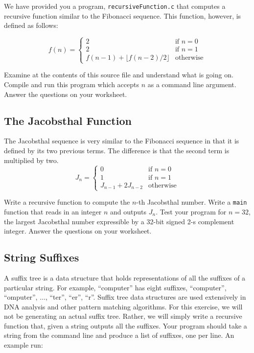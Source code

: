 \documentclass[12pt]{scrartcl}
\begin{document}
We have provided you a program, \texttt{recursiveFunction.c} 
that computes a recursive function similar to the Fibonacci sequence.  
This function, however, is defined as follows: 

$$f(n) = \left\{
\begin{array}{ll}
2 & \textrm{if } n = 0 \\
2 & \textrm{if } n = 1 \\
f(n-1) + \lfloor f(n-2) / 2 \rfloor & \textrm{otherwise}
\end{array}
\right.$$

Examine at the contents of this source file and understand what is 
going on.  Compile and run this program which accepts $n$ as a 
command line argument.  Answer the questions on your worksheet.

\subsection{The Jacobsthal Function}

The Jacobsthal sequence is very similar to the Fibonacci sequence 
in that it is defined by its two previous terms.  The difference is that 
the second term is multiplied by two.  
$$J_n = \left\{
\begin{array}{ll}
0 & \textrm{if } n = 0 \\
1 & \textrm{if } n = 1 \\
J_{n-1} + 2J_{n-2} & \textrm{otherwise}
\end{array}
\right.$$

Write a recursive function to compute the $n$-th Jacobsthal number.  
Write a \texttt{main} function that reads in an integer $n$ and 
outputs $J_n$.  Test your program for $n = 32$, the largest Jacobsthal 
number expressible by a 32-bit signed 2-s complement integer.  
Answer the questions on your worksheet.

\subsection{String Suffixes}

A suffix tree is a data structure that holds representations of all the 
suffixes of a particular string.  For example, ``computer'' has eight 
suffixes, ``computer'', ``omputer'', $\ldots$, ``ter'', ``er'', ``r''.  Suffix 
tree data structures are used extensively in DNA analysis and other 
pattern matching algorithms.  For this exercise, we will not be 
generating an actual suffix tree.  Rather, we will simply write a 
recursive function that, given a string outputs all the suffixes.  
Your program should take a string from the command line and 
produce a list of suffixes, one per line.  An example run: 
\end{document}
